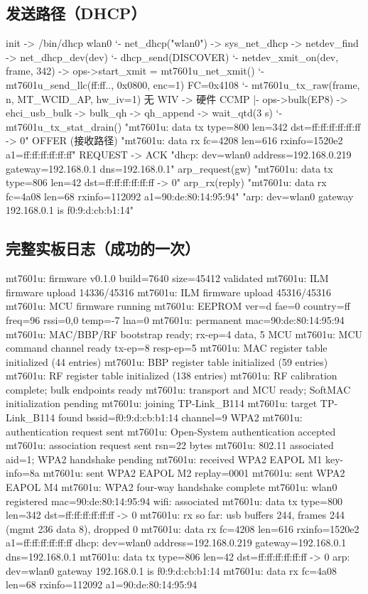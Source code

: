 \documentclass[UTF8,zihao=-4,fontset=none]{ctexart}
\begin{document}
\subsection{发送路径（DHCP）}
\begin{code}
init -> /bin/dhcp wlan0
 `- net_dhcp("wlan0") -> sys_net_dhcp -> netdev_find -> net_dhcp_dev(dev)
     `- dhcp_send(DISCOVER)
         `- netdev_xmit_on(dev, frame, 342) -> ops->start_xmit = mt7601u_net_xmit()
             `- mt7601u_send_llc(ff:ff.., 0x0800, enc=1)        FC=0x4108
                 `- mt7601u_tx_raw(frame, n, MT_WCID_AP, hw_iv=1)  无 WIV -> 硬件 CCMP
                     |- ops->bulk(EP8) -> ehci_usb_bulk -> bulk_qh -> qh_append -> wait_qtd(3 s)
                     `- mt7601u_tx_stat_drain()
                     "mt7601u: data tx type=800 len=342 dst=ff:ff:ff:ff:ff:ff -> 0"
 OFFER (接收路径)    "mt7601u: data rx fc=4208 len=616 rxinfo=1520e2 a1=ff:ff:ff:ff:ff:ff"
 REQUEST -> ACK      "dhcp: dev=wlan0 address=192.168.0.219 gateway=192.168.0.1 dns=192.168.0.1"
 arp_request(gw)     "mt7601u: data tx type=806 len=42 dst=ff:ff:ff:ff:ff:ff -> 0"
 arp_rx(reply)       "mt7601u: data rx fc=4a08 len=68 rxinfo=112092 a1=90:de:80:14:95:94"
                     "arp: dev=wlan0 gateway 192.168.0.1 is f0:9:d:cb:b1:14"
\end{code}

\subsection{完整实板日志（成功的一次）}
\begin{logv}
mt7601u: firmware v0.1.0 build=7640 size=45412 validated
mt7601u: ILM firmware upload 14336/45316
mt7601u: ILM firmware upload 45316/45316
mt7601u: MCU firmware running
mt7601u: EEPROM ver=d fae=0 country=ff freq=96 rssi=0,0 temp=-7 lna=0
mt7601u: permanent mac=90:de:80:14:95:94
mt7601u: MAC/BBP/RF bootstrap ready; rx-ep=4 data, 5 MCU
mt7601u: MCU command channel ready tx-ep=8 resp-ep=5
mt7601u: MAC register table initialized (44 entries)
mt7601u: BBP register table initialized (59 entries)
mt7601u: RF register table initialized (138 entries)
mt7601u: RF calibration complete; bulk endpoints ready
mt7601u: transport and MCU ready; SoftMAC initialization pending
mt7601u: joining TP-Link_B114
mt7601u: target TP-Link_B114 found bssid=f0:9:d:cb:b1:14 channel=9 WPA2
mt7601u: authentication request sent
mt7601u: Open-System authentication accepted
mt7601u: association request sent rsn=22 bytes
mt7601u: 802.11 associated aid=1; WPA2 handshake pending
mt7601u: received WPA2 EAPOL M1 key-info=8a
mt7601u: sent WPA2 EAPOL M2 replay=0001
mt7601u: sent WPA2 EAPOL M4
mt7601u: WPA2 four-way handshake complete
mt7601u: wlan0 registered mac=90:de:80:14:95:94
wifi: associated
mt7601u: data tx type=800 len=342 dst=ff:ff:ff:ff:ff:ff -> 0
mt7601u: rx so far: usb buffers 244, frames 244 (mgmt 236 data 8), dropped 0
mt7601u: data rx fc=4208 len=616 rxinfo=1520e2 a1=ff:ff:ff:ff:ff:ff
dhcp: dev=wlan0 address=192.168.0.219 gateway=192.168.0.1 dns=192.168.0.1
mt7601u: data tx type=806 len=42 dst=ff:ff:ff:ff:ff:ff -> 0
arp: dev=wlan0 gateway 192.168.0.1 is f0:9:d:cb:b1:14
mt7601u: data rx fc=4a08 len=68 rxinfo=112092 a1=90:de:80:14:95:94
\end{logv}
\end{document}
